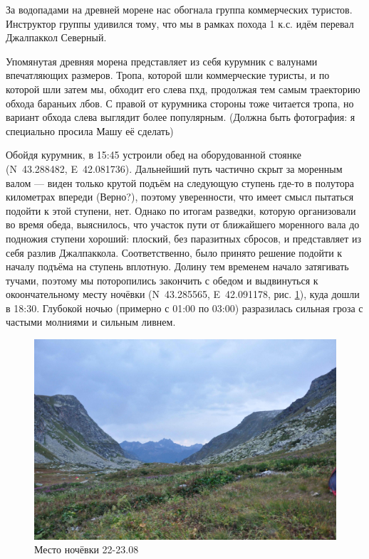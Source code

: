За водопадами на древней морене нас обогнала группа коммерческих туристов. Инструктор группы удивился тому, что мы в рамках похода 1 к.с. идём перевал Джалпаккол Северный. 

Упомянутая древняя морена представляет из себя курумник с валунами впечатляющих размеров. Тропа, которой шли коммерческие туристы, и по которой шли затем мы, обходит его слева пхд, продолжая тем самым траекторию обхода бараньих лбов. С правой от курумника стороны тоже читается тропа, но вариант обхода слева выглядит более популярным. \alert{(Должна быть фотография: я специально просила Машу её сделать)}

Обойдя курумник, в 15:45 устроили обед на оборудованной стоянке (N~43.288482\degree, E~42.081736\degree). Дальнейший путь частично скрыт за моренным валом --- виден только крутой подъём на следующую ступень где-то в полутора километрах впереди \alert{(Верно?)}, поэтому уверенности, что имеет смысл пытаться подойти к этой ступени, нет. Однако по итогам разведки, которую организовали во время обеда, выяснилось, что участок пути от ближайшего моренного вала до подножия ступени хороший: плоский, без паразитных сбросов, и представляет из себя разлив Джалпаккола. Соответственно, было принято решение подойти к началу подъёма на ступень вплотную. Долину тем временем начало затягивать тучами, поэтому
мы поторопились закончить с обедом и выдвинуться к окоончательному месту ночёвки (N~43.285565\degree, E~42.091178\degree, рис. \ref{fig:DSC_0018}), куда дошли в 18:30. Глубокой ночью (примерно с 01:00 по 03:00) разразилась сильная гроза с частыми молниями и сильным ливнем.

\begin{figure}[h!]
	\centering
	\includegraphics[width=0.7\linewidth]{../pics/DSC_0018}
	\caption{Место ночёвки 22-23.08}
	\label{fig:DSC_0018}
\end{figure}

\clearpage
